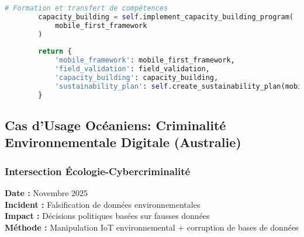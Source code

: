 \begin{lstlisting}[language=Python, caption=Investigation transfrontalière africaine mobile money]
        # Formation et transfert de compétences
        capacity_building = self.implement_capacity_building_program(
            mobile_first_framework
        )
        
        return {
            'mobile_framework': mobile_first_framework,
            'field_validation': field_validation,
            'capacity_building': capacity_building,
            'sustainability_plan': self.create_sustainability_plan(mobile_first_framework)
        }
\end{lstlisting}

\subsection{Cas d'Usage Océaniens: Criminalité Environnementale Digitale (Australie)}

\subsubsection{Intersection Écologie-Cybercriminalité}

\textbf{Date :} Novembre 2025 \\
\textbf{Incident :} Falsification de données environnementales \\
\textbf{Impact :} Décisions politiques basées sur fausses données \\
\textbf{Méthode :} Manipulation IoT environnemental + corruption de bases de données

